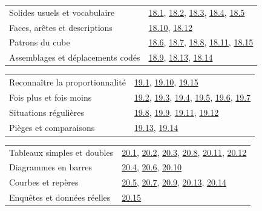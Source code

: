 \begin{tabularx}{\linewidth}{@{}Yl@{}}\toprule
Solides usuels et vocabulaire & \hyperref[exo-18-1]{18.1}, \hyperref[exo-18-2]{18.2}, \hyperref[exo-18-3]{18.3}, \hyperref[exo-18-4]{18.4}, \hyperref[exo-18-5]{18.5}\\[2mm]
Faces, arêtes et descriptions & \hyperref[exo-18-10]{18.10}, \hyperref[exo-18-12]{18.12}\\[2mm]
Patrons du cube & \hyperref[exo-18-6]{18.6}, \hyperref[exo-18-7]{18.7}, \hyperref[exo-18-8]{18.8}, \hyperref[exo-18-11]{18.11}, \hyperref[exo-18-15]{18.15}\\[2mm]
Assemblages et déplacements codés & \hyperref[exo-18-9]{18.9}, \hyperref[exo-18-13]{18.13}, \hyperref[exo-18-14]{18.14}\\[2mm]
\bottomrule\end{tabularx}\par\vspace{4mm}
\clearpage
{}\fontsize{10}{13}\selectfont
{}\begin{tabularx}{\linewidth}{@{}Yl@{}}\toprule
Reconnaître la proportionnalité & \hyperref[exo-19-1]{19.1}, \hyperref[exo-19-10]{19.10}, \hyperref[exo-19-15]{19.15}\\[2mm]
Fois plus et fois moins & \hyperref[exo-19-2]{19.2}, \hyperref[exo-19-3]{19.3}, \hyperref[exo-19-4]{19.4}, \hyperref[exo-19-5]{19.5}, \hyperref[exo-19-6]{19.6}, \hyperref[exo-19-7]{19.7}\\[2mm]
Situations régulières & \hyperref[exo-19-8]{19.8}, \hyperref[exo-19-9]{19.9}, \hyperref[exo-19-11]{19.11}, \hyperref[exo-19-12]{19.12}\\[2mm]
Pièges et comparaisons & \hyperref[exo-19-13]{19.13}, \hyperref[exo-19-14]{19.14}\\[2mm]
\bottomrule\end{tabularx}\par\vspace{4mm}
\begin{tabularx}{\linewidth}{@{}Yl@{}}\toprule
Tableaux simples et doubles & \hyperref[exo-20-1]{20.1}, \hyperref[exo-20-2]{20.2}, \hyperref[exo-20-3]{20.3}, \hyperref[exo-20-8]{20.8}, \hyperref[exo-20-11]{20.11}, \hyperref[exo-20-12]{20.12}\\[2mm]
Diagrammes en barres & \hyperref[exo-20-4]{20.4}, \hyperref[exo-20-6]{20.6}, \hyperref[exo-20-10]{20.10}\\[2mm]
Courbes et repères & \hyperref[exo-20-5]{20.5}, \hyperref[exo-20-7]{20.7}, \hyperref[exo-20-9]{20.9}, \hyperref[exo-20-13]{20.13}, \hyperref[exo-20-14]{20.14}\\[2mm]
Enquêtes et données réelles & \hyperref[exo-20-15]{20.15}\\[2mm]
\bottomrule\end{tabularx}\par\vspace{4mm}
